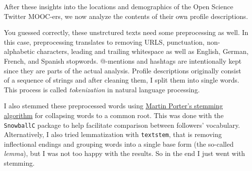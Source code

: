 \documentclass[]{article}
\begin{document}
After these insights into the locations and demographics of the Open
Science Twitter MOOC-ers, we now analyze the contents of their own
profile descriptions.

You guessed correctly, these unstrctured texts need some preprocessing
as well. In this case, preprocessing translates to removing URLS,
punctuation, non-alphabetic characters, leading and trailing whitespace
as well as English, German, French, and Spanish stopwords. @-mentions
and hashtags are intentionally kept since they are parts of the actual
analysis. Profile descriptions originally consist of a sequence of
strings and after cleaning them, I split them into single words. This
process is called \emph{tokenization} in natural language processing.

I also stemmed these preprocessed words using
\href{http://www.cs.toronto.edu/~frank/csc2501/Readings/R2_Porter/Porter-1980.pdf}{Martin
Porter's stemming algorithm} for collapsing words to a common root. This
was done with the \texttt{SnowballC} package to help facilitate
comparison between followers' vocabulary. Alternatively, I also tried
lemmatization with \texttt{textstem}, that is removing inflectional
endings and grouping words into a single base form (the so-called
\emph{lemma}), but I was not too happy with the results. So in the end I
just went with stemming.
\end{document}
